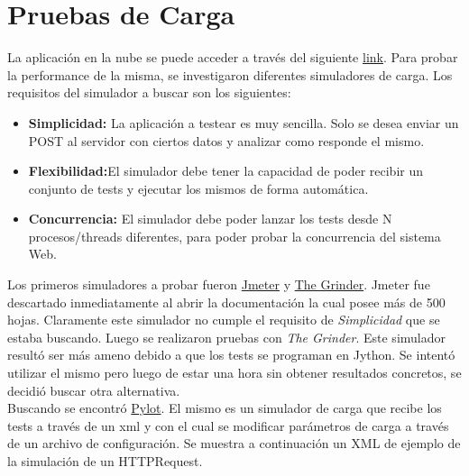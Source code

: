 \documentclass[a4paper,10pt]{article}
\begin{document}


    \newpage
    \section{Pruebas de Carga}
        La aplicación en la nube se puede acceder a través del siguiente 
        \href{https://poised-throne-110314.appspot.com}{link}.
        Para probar la performance de la misma, se investigaron diferentes simuladores de carga. Los requisitos del  
        simulador a buscar son los siguientes:

        \begin{itemize}
            \item \textbf{Simplicidad:} La aplicación a testear es muy sencilla. Solo se desea enviar un POST al 
            servidor con ciertos datos y analizar como responde el mismo. 
            \item \textbf{Flexibilidad:}El simulador debe tener la capacidad de poder recibir un conjunto de tests y 
            ejecutar los mismos de forma automática.
            \item \textbf{Concurrencia:} El simulador debe poder lanzar los tests desde N procesos/threads diferentes, 
            para poder probar la concurrencia del sistema Web.
        \end{itemize}

        Los primeros simuladores a probar fueron \href{http://http://jmeter.apache.org}{Jmeter} y 
        \href{http://grinder.sourceforge.net}{The Grinder}. Jmeter fue descartado inmediatamente al abrir la 
        documentación la cual posee más de 500 hojas. Claramente este simulador no cumple el requisito de 
        \textit{Simplicidad} que se estaba buscando. Luego se realizaron pruebas con \textit{The Grinder}. Este 
        simulador resultó ser más ameno debido a que los tests se programan en Jython. Se intentó utilizar el
        mismo pero luego de estar una hora sin obtener resultados concretos, se decidió buscar otra alternativa. \\
        \indent Buscando se encontró \href{http://www.pylot.org/}{Pylot}. El mismo es un simulador de carga que 
        recibe los tests a través de un xml y con el cual se modificar parámetros de carga a través de un 
        archivo de configuración. Se muestra a continuación un XML de ejemplo de la simulación de un HTTPRequest. 
\end{document}
